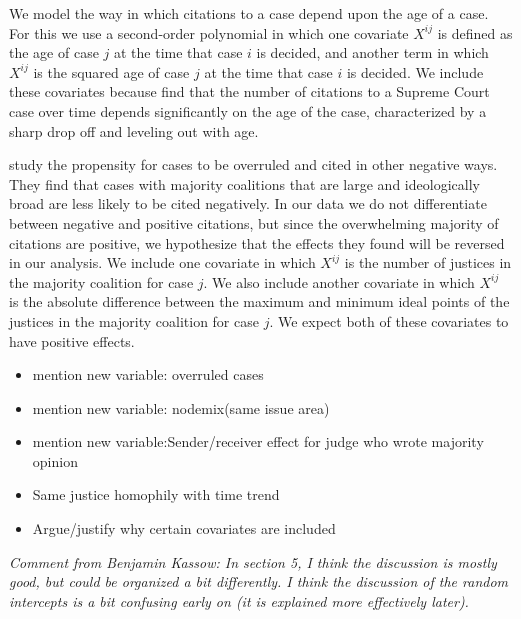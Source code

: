 \documentclass[headsepline=true, abstracton]{scrartcl}
\begin{document}
We model the way in which citations to a case depend upon the age of a case. For this we use a second-order polynomial in which one covariate $X^{ij}$ is defined as the age of case $j$ at the time that case $i$ is decided, and another term in which $X^{ij}$ is the squared age of case $j$ at the time that case $i$ is decided. We include these covariates because \citet{black2013citation} find that the number of citations to a Supreme Court case over time depends significantly on the age of the case, characterized by a sharp drop off and leveling out with age. 

\citet{benjamin2012standing} study the propensity for cases to be overruled and cited in other negative ways. They find that cases with majority coalitions that are large and ideologically broad are less likely to be cited negatively. In our data we do not differentiate between negative and positive citations, but since the overwhelming majority of citations are positive, we hypothesize that the effects they found will be reversed in our analysis. We include one covariate in which $X^{ij}$ is the number of justices in the majority coalition for case $j$. We also include another covariate in which $X^{ij}$ is the absolute difference between the maximum and minimum ideal points of the justices in the majority coalition for case $j$. We expect both of these covariates to have positive effects.

\begin{itemize}
\item mention new variable: overruled cases
\item mention new variable: nodemix(same issue area)
\item mention new variable:Sender/receiver effect for judge who wrote majority opinion
\item Same justice homophily with time trend
\item Argue/justify why certain covariates are included
\end{itemize}


\textit{Comment from Benjamin Kassow: In section 5, I think the discussion is mostly good, but could be organized a bit differently. 
I think the discussion of the random intercepts is a bit confusing early on (it is explained more effectively later). }

\end{document}
